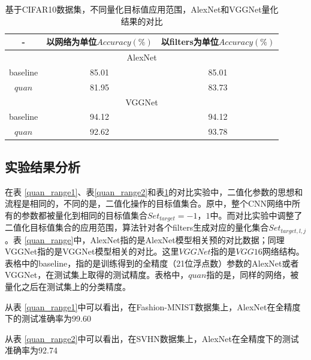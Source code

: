 \documentclass[ pdftex, oneside, master]{NJUthesis}
\begin{document}
\begin{table}[!htbp]
\caption{基于CIFAR10数据集，不同量化目标值应用范围，AlexNet和VGGNet量化结果的对比}
\begin{tabular}{|c|c|c|}
\hline
- & 以网络为单位\cite{binary}$Accuracy(\%)$  & 以filters为单位$Accuracy(\%)$  \\ \hline
\multicolumn{3}{|c|}{AlexNet} \\ \hline
baseline & 85.01 & 85.01  \\ \hline
$quan$ & 81.95 & 83.73 \\
\hline
\hline
\multicolumn{3}{|c|}{VGGNet} \\ \hline
baseline & 94.12 & 94.12  \\ \hline
$quan$ & 92.62 & 93.78 \\ \hline
\end{tabular}
\label{quan_range3}
\end{table}


\subsection{实验结果分析}

在表 \ref{quan_range1}、表\ref{quan_range2}和表\ref{quan_range3}的对比实验中，二值化参数的思想和流程是相同的，不同的是，二值化操作的目标值集合。原\cite{binary}中，整个CNN网络中所有的参数都被量化到相同的目标值集合$Set_{target} = {-1，1}$中。而对比实验中调整了二值化目标值集合的应用范围，算法针对各个filters生成对应的量化集合$Set_ {target,l,j}$。表  \ref{quan_range}中，AlexNet指的是AlexNet模型相关预的对比数据；同理VGGNet指的是VGGNet模型相关的对比。这里$VGGNet$指的是$VGG16$网络结构。表格中的baseline，指的是训练得到的全精度（21位浮点数）参数的AlexNet或者VGGNet，在测试集上取得的测试精度。表格中，$quan$指的是，同样的网络，被量化之后在测试集上的分类精度。

从表 \ref{quan_range1}中可以看出，在Fashion-MNIST数据集上，AlexNet在全精度下的测试准确率为99.60%

从表 \ref{quan_range2}中可以看出，在SVHN数据集上，AlexNet在全精度下的测试准确率为92.74%
\end{document}
